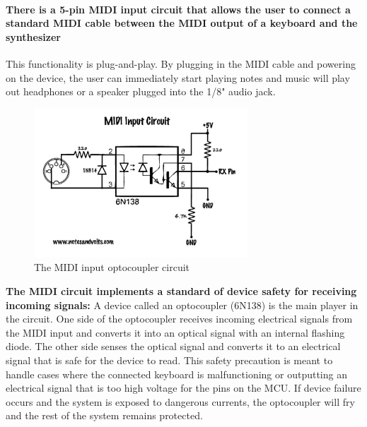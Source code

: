 \documentclass[acmlarge,screen]{acmart}
\begin{document}
	\paragraph{There is a 5-pin MIDI input circuit that allows the user to connect a standard MIDI cable between the MIDI output of a keyboard and the synthesizer} This functionality is plug-and-play. By plugging in the MIDI cable and powering on the device, the user can immediately start playing notes and music will play out headphones or a speaker  plugged into the 1/8" audio jack.
	
	\begin{figure}
		\includegraphics[width=8cm]{midi_optocoupler_circuit}
		\caption{The MIDI input optocoupler circuit}
		\centering
	\end{figure}

	\textbf{The MIDI circuit implements a standard of device safety for receiving incoming signals:} A device called an optocoupler (6N138) is the main player in the circuit. One side of the optocoupler receives incoming electrical signals from the MIDI input and converts it into an optical signal with an internal flashing diode. The other side senses the optical signal and converts it to an electrical signal that is safe for the device to read. This safety precaution is meant to handle cases where the connected keyboard is malfunctioning or outputting an electrical signal that is too high voltage for the pins on the MCU. If device failure occurs and the system is exposed to dangerous currents, the optocoupler will fry and the rest of the system remains protected. \cite{notesandvolts}
	
\end{document}
